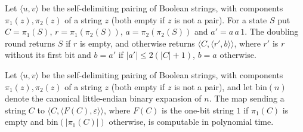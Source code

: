 \begin{definition}
\label{Complexity.ladner_countStep}
\leanok
{}
Let $\langle u,v\rangle$ be the self-delimiting pairing of Boolean strings, with components $\pi_1(z),\pi_2(z)$ of a string $z$ (both empty if $z$ is not a pair). For a state $S$ put $C=\pi_1(S)$, $r=\pi_1(\pi_2(S))$, $a=\pi_2(\pi_2(S))$ and
$a'=a\,a\,1$. The doubling round returns $S$ if $r$ is empty, and otherwise returns
$\langle C,\langle r',b\rangle\rangle$, where $r'$ is $r$ without its first bit and $b=a'$ if
$|a'|\le 2(|C|+1)$, $b=a$ otherwise.
\end{definition}

\begin{theorem}
\label{Complexity.ladner_countInit_FP}
\leanok
{}
Let $\langle u,v\rangle$ be the self-delimiting pairing of Boolean strings, with components $\pi_1(z),\pi_2(z)$ of a string $z$ (both empty if $z$ is not a pair), and let $\mathrm{bin}(n)$ denote the canonical little-endian binary expansion of $n$. The map sending a string $C$ to
$\langle C,\langle F(C),\varepsilon\rangle\rangle$, where $F(C)$ is the one-bit string $1$ if
$\pi_1(C)$ is empty and $\mathrm{bin}(|\pi_1(C)|)$ otherwise, is computable in polynomial time.
\end{theorem}

